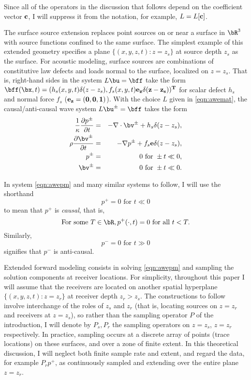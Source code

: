 Since all of the operators in the discussion that follows depend on
the coefficient vector 
$\bf{c}$, I will suppress it from the notation, for example, $L=L[\bf{c}]$.

The surface source extension replaces point sources on or near a
surface in $\bR^3$ with source functions confined to the same
surface. The simplest example of this extended geometry specifies a
plane $\{(x,y,z,t): z=z_s\}$ at source depth $z_s$ as the surface. For
acoustic modeling, surface sources are combinations of constitutive law
defects and loads normal to the surface, localized on $z=z_s$. That
is, right-hand sides in the system $L\bu=\bff$ take the form
$\bff(\bx,t) = (h_s(x,y,t)\delta(z-z_s),
f_s(x,y,t)\bf{e}_z\delta(z-z_s))^T$ for scalar defect $h_s$ and normal
force $f_s$ ($\bf{e}_z=(0,0,1)$). With the choice $L$ given in
\ref{eqn:awemat}, the causal/anti-causal wave system $L\bu^{\pm}=\bff$
takes the form
\begin{eqnarray}
\label{eqn:awepm}
\frac{1}{\kappa}\frac{\partial p^{\pm}}{\partial t} & = & - \nabla \cdot \bv^{\pm} +
h_s \delta(z-z_s), \nonumber \\
\rho\frac{\partial \bv^{\pm}}{\partial t} & = & - \nabla p^{\pm} +
                                                f_s{\bf e} \delta(z-z_s),\nonumber \\
p^{\pm} & =& 0 \mbox{ for } \pm t \ll 0,\nonumber\\ 
\bv^{\pm} & = & 0 \mbox{ for } \pm t \ll 0.
\end{eqnarray}

 In system \ref{eqn:awepm} and many similar
systems to follow, I will use the shorthand
\[
  p^+ = 0 \mbox{ for } t \ll 0 
\]
to mean that $p^+$ is {\em causal}, that is,
\[
  \mbox{For some } T \in \bR, p^+(\cdot,t) = 0 \mbox{ for all } t <
  T.
\]
Similarly,
\[
  p^- = 0 \mbox{ for } t \gg 0 
\]
signifies that $p^-$ is anti-causal.

Extended forward modeling consists in solving \ref{eqn:awepm} and
sampling the solution components at receiver locations. For
simplicity, throughout this paper I will assume that the receivers are
located on another spatial hyperplane $\{(x,y,z,t): z=z_r\}$ at
receiver depth $z_r>z_s$. The constructions to follow involve interchange
of the roles of $z_s$ and $z_r$ (that is, locating sources on $z=z_r$
and receivers at $z=z_s$), so rather than the sampling operator $P$ of
the introduction, I will denote by $P_s,P_r$ the sampling 
operators on $z=z_s$, $z=z_r$ respectively. In practice, sampling
occurs at a discrete array of points (trace locations) on these
surfaces, and over a zone of finite extent. In this theoretical
discussion, I will neglect both finite sample rate and extent, and
regard the data, for example $P_rp^+$, as continuously sampled and
extending over the entire plane $z=z_r$.


